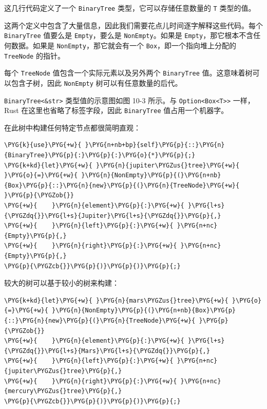 这几行代码定义了一个 \texttt{BinaryTree} 类型，它可以存储任意数量的 \texttt{T} 类型的值。

这两个定义中包含了大量信息，因此我们需要花点儿时间逐字解释这些代码。每个 \texttt{BinaryTree} 值要么是 \texttt{Empty}，要么是 \texttt{NonEmpty}。如果是 \texttt{Empty}，那它根本不含任何数据。如果是 \texttt{NonEmpty}，那它就会有一个 \texttt{Box}，即一个指向堆上分配的 \texttt{TreeNode} 的指针。

每个 \texttt{TreeNode} 值包含一个实际元素以及另外两个 \texttt{BinaryTree} 值。这意味着树可以包含子树，因此 \texttt{NonEmpty} 树可以有任意数量的后代。

\texttt{BinaryTree<\&str>} 类型值的示意图如图 10-3 所示。与 \texttt{Option<Box<T>>} 一样，Rust 在这里也省略了标签字段，因此 \texttt{BinaryTree} 值占用一个机器字。


在此树中构建任何特定节点都很简明直观：

\begin{Verbatim}[commandchars=\\\{\},breaklines=true,breakanywhere=true,fontsize=\codefont,xleftmargin=17bp]
\PYG{k}{use}\PYG{+w}{ }\PYG{n+nb+bp}{self}\PYG{p}{::}\PYG{n}{BinaryTree}\PYG{p}{:}\PYG{p}{:}\PYG{o}{*}\PYG{p}{;}
\PYG{k+kd}{let}\PYG{+w}{ }\PYG{n}{jupiter\PYGZus{}tree}\PYG{+w}{ }\PYG{o}{=}\PYG{+w}{ }\PYG{n}{NonEmpty}\PYG{p}{(}\PYG{n+nb}{Box}\PYG{p}{::}\PYG{n}{new}\PYG{p}{(}\PYG{n}{TreeNode}\PYG{+w}{ }\PYG{p}{\PYGZob{}}
\PYG{+w}{    }\PYG{n}{element}\PYG{p}{:}\PYG{+w}{ }\PYG{l+s}{\PYGZdq{}}\PYG{l+s}{Jupiter}\PYG{l+s}{\PYGZdq{}}\PYG{p}{,}
\PYG{+w}{    }\PYG{n}{left}\PYG{p}{:}\PYG{+w}{ }\PYG{n+nc}{Empty}\PYG{p}{,}
\PYG{+w}{    }\PYG{n}{right}\PYG{p}{:}\PYG{+w}{ }\PYG{n+nc}{Empty}\PYG{p}{,}
\PYG{p}{\PYGZcb{}}\PYG{p}{)}\PYG{p}{)}\PYG{p}{;}
\end{Verbatim}

较大的树可以基于较小的树来构建：

\begin{Verbatim}[commandchars=\\\{\},breaklines=true,breakanywhere=true,fontsize=\codefont,xleftmargin=17bp]
\PYG{k+kd}{let}\PYG{+w}{ }\PYG{n}{mars\PYGZus{}tree}\PYG{+w}{ }\PYG{o}{=}\PYG{+w}{ }\PYG{n}{NonEmpty}\PYG{p}{(}\PYG{n+nb}{Box}\PYG{p}{::}\PYG{n}{new}\PYG{p}{(}\PYG{n}{TreeNode}\PYG{+w}{ }\PYG{p}{\PYGZob{}}
\PYG{+w}{    }\PYG{n}{element}\PYG{p}{:}\PYG{+w}{ }\PYG{l+s}{\PYGZdq{}}\PYG{l+s}{Mars}\PYG{l+s}{\PYGZdq{}}\PYG{p}{,}
\PYG{+w}{    }\PYG{n}{left}\PYG{p}{:}\PYG{+w}{ }\PYG{n+nc}{jupiter\PYGZus{}tree}\PYG{p}{,}
\PYG{+w}{    }\PYG{n}{right}\PYG{p}{:}\PYG{+w}{ }\PYG{n+nc}{mercury\PYGZus{}tree}\PYG{p}{,}
\PYG{p}{\PYGZcb{}}\PYG{p}{)}\PYG{p}{)}\PYG{p}{;}
\end{Verbatim}

